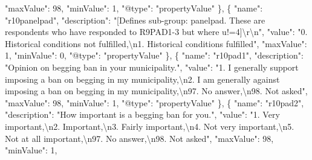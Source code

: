 \documentclass[
]{book}
\newenvironment{Shaded}{\begin{snugshade}}{\end{snugshade}}
\newcommand{\CharTok}[1]{\textcolor[rgb]{0.31,0.60,0.02}{#1}}
\newcommand{\DataTypeTok}[1]{\textcolor[rgb]{0.13,0.29,0.53}{#1}}
\newcommand{\DecValTok}[1]{\textcolor[rgb]{0.00,0.00,0.81}{#1}}
\newcommand{\FunctionTok}[1]{\textcolor[rgb]{0.00,0.00,0.00}{#1}}
\newcommand{\OtherTok}[1]{\textcolor[rgb]{0.56,0.35,0.01}{#1}}
\newcommand{\StringTok}[1]{\textcolor[rgb]{0.31,0.60,0.02}{#1}}
\begin{document}
\begin{Shaded}
\begin{Highlighting}[]
      \DataTypeTok{"maxValue"}\FunctionTok{:} \DecValTok{98}\FunctionTok{,}
      \DataTypeTok{"minValue"}\FunctionTok{:} \DecValTok{1}\FunctionTok{,}
      \DataTypeTok{"@type"}\FunctionTok{:} \StringTok{"propertyValue"}
    \FunctionTok{\}}\OtherTok{,}
    \FunctionTok{\{}
      \DataTypeTok{"name"}\FunctionTok{:} \StringTok{"r10panelpad"}\FunctionTok{,}
      \DataTypeTok{"description"}\FunctionTok{:} \StringTok{"[Defines sub-group: panelpad. These are respondents who have responded to R9PAD1-3 but where u!=4]}\CharTok{\textbackslash{}r\textbackslash{}n}\StringTok{"}\FunctionTok{,}
      \DataTypeTok{"value"}\FunctionTok{:} \StringTok{"0. Historical conditions not fulfilled,}\CharTok{\textbackslash{}n}\StringTok{1. Historical conditions fulfilled"}\FunctionTok{,}
      \DataTypeTok{"maxValue"}\FunctionTok{:} \DecValTok{1}\FunctionTok{,}
      \DataTypeTok{"minValue"}\FunctionTok{:} \DecValTok{0}\FunctionTok{,}
      \DataTypeTok{"@type"}\FunctionTok{:} \StringTok{"propertyValue"}
    \FunctionTok{\}}\OtherTok{,}
    \FunctionTok{\{}
      \DataTypeTok{"name"}\FunctionTok{:} \StringTok{"r10pad1"}\FunctionTok{,}
      \DataTypeTok{"description"}\FunctionTok{:} \StringTok{"Opinion on begging ban in your municipality."}\FunctionTok{,}
      \DataTypeTok{"value"}\FunctionTok{:} \StringTok{"1. I generally support imposing a ban on begging in my municipality,}\CharTok{\textbackslash{}n}\StringTok{2. I am generally against imposing a ban on begging in my municipality,}\CharTok{\textbackslash{}n}\StringTok{97. No answer,}\CharTok{\textbackslash{}n}\StringTok{98. Not asked"}\FunctionTok{,}
      \DataTypeTok{"maxValue"}\FunctionTok{:} \DecValTok{98}\FunctionTok{,}
      \DataTypeTok{"minValue"}\FunctionTok{:} \DecValTok{1}\FunctionTok{,}
      \DataTypeTok{"@type"}\FunctionTok{:} \StringTok{"propertyValue"}
    \FunctionTok{\}}\OtherTok{,}
    \FunctionTok{\{}
      \DataTypeTok{"name"}\FunctionTok{:} \StringTok{"r10pad2"}\FunctionTok{,}
      \DataTypeTok{"description"}\FunctionTok{:} \StringTok{"How important is a begging ban for you."}\FunctionTok{,}
      \DataTypeTok{"value"}\FunctionTok{:} \StringTok{"1. Very important,}\CharTok{\textbackslash{}n}\StringTok{2. Important,}\CharTok{\textbackslash{}n}\StringTok{3. Fairly important,}\CharTok{\textbackslash{}n}\StringTok{4. Not very important,}\CharTok{\textbackslash{}n}\StringTok{5. Not at all important,}\CharTok{\textbackslash{}n}\StringTok{97. No answer,}\CharTok{\textbackslash{}n}\StringTok{98. Not asked"}\FunctionTok{,}
      \DataTypeTok{"maxValue"}\FunctionTok{:} \DecValTok{98}\FunctionTok{,}
      \DataTypeTok{"minValue"}\FunctionTok{:} \DecValTok{1}\FunctionTok{,}

\end{Highlighting}
\end{Shaded}
\end{document}
